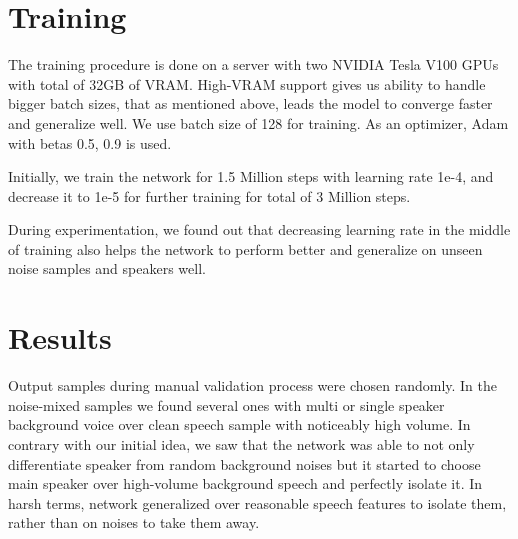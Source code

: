 \documentclass{article}
\begin{document}
    


\section{Training}
\begin{flushleft}

The training procedure is done on a server with two NVIDIA Tesla V100 GPUs with total of 32GB of VRAM. High-VRAM support gives us ability to handle bigger batch sizes, that as mentioned above, leads the model to converge faster and generalize well. We use batch size of 128 for training. As an optimizer, Adam with betas 0.5, 0.9 is used. 

Initially, we train the network for 1.5 Million steps with learning rate 1e-4, and decrease it to 1e-5 for further training for total of 3 Million steps.
\end{flushleft}

\begin{flushleft}
During experimentation, we found out that decreasing learning rate in the middle of training also helps the network to perform better and generalize on unseen noise samples and speakers well.

\end{flushleft}

\section{Results}





\begin{flushleft}

Output samples during manual validation process were chosen randomly.
In the noise-mixed samples we found several ones with multi or single speaker background voice over clean speech sample with noticeably high volume. In contrary with our initial idea, we saw that the network was able to not only differentiate speaker from random background noises but it started to choose main speaker over high-volume background speech and perfectly isolate it. In harsh terms, network generalized over reasonable speech features to isolate them, rather than on noises to take them away. 



\end{flushleft}
\end{document}
